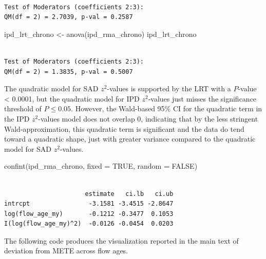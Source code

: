 \documentclass[
  letterpaper,
  DIV=11,
  numbers=noendperiod]{scrartcl}
\newenvironment{Shaded}{\begin{snugshade}}{\end{snugshade}}
\newcommand{\AttributeTok}[1]{\textcolor[rgb]{0.40,0.45,0.13}{#1}}
\newcommand{\ConstantTok}[1]{\textcolor[rgb]{0.56,0.35,0.01}{#1}}
\newcommand{\FunctionTok}[1]{\textcolor[rgb]{0.28,0.35,0.67}{#1}}
\newcommand{\NormalTok}[1]{\textcolor[rgb]{0.00,0.23,0.31}{#1}}
\newcommand{\OtherTok}[1]{\textcolor[rgb]{0.00,0.23,0.31}{#1}}
\begin{document}
\begin{verbatim}

Test of Moderators (coefficients 2:3):
QM(df = 2) = 2.7039, p-val = 0.2587
\end{verbatim}

\begin{Shaded}
\begin{Highlighting}[]
\NormalTok{ipd\_lrt\_chrono }\OtherTok{\textless{}{-}} \FunctionTok{anova}\NormalTok{(ipd\_rma\_chrono)}
\NormalTok{ipd\_lrt\_chrono}
\end{Highlighting}
\end{Shaded}

\begin{verbatim}

Test of Moderators (coefficients 2:3):
QM(df = 2) = 1.3835, p-val = 0.5007
\end{verbatim}

The quadratic model for SAD \(z^2\)-values is supported by the LRT with
a \(P\)-value \textless{} 0.0001, but the quadratic model for IPD
\(z^2\)-values just misses the significance threshold of
\(P \leq 0.05\). However, the Wald-based 95\% CI for the quadratic term
in the IPD \(z^2\)-values model does not overlap 0, indicating that by
the less stringent Wald-approximation, this quadratic term is
significant and the data do tend toward a quadratic shape, just with
greater variance compared to the quadratic model for SAD \(z^2\)-values.

\begin{Shaded}
\begin{Highlighting}[]
\FunctionTok{confint}\NormalTok{(ipd\_rma\_chrono, }\AttributeTok{fixed =} \ConstantTok{TRUE}\NormalTok{, }\AttributeTok{random =} \ConstantTok{FALSE}\NormalTok{)}
\end{Highlighting}
\end{Shaded}

\begin{verbatim}

                      estimate   ci.lb   ci.ub 
intrcpt                -3.1581 -3.4515 -2.8647 
log(flow_age_my)       -0.1212 -0.3477  0.1053 
I(log(flow_age_my)^2)  -0.0126 -0.0454  0.0203 
\end{verbatim}

The following code produces the visualization reported in the main text
of deviation from METE across flow ages.
\end{document}
